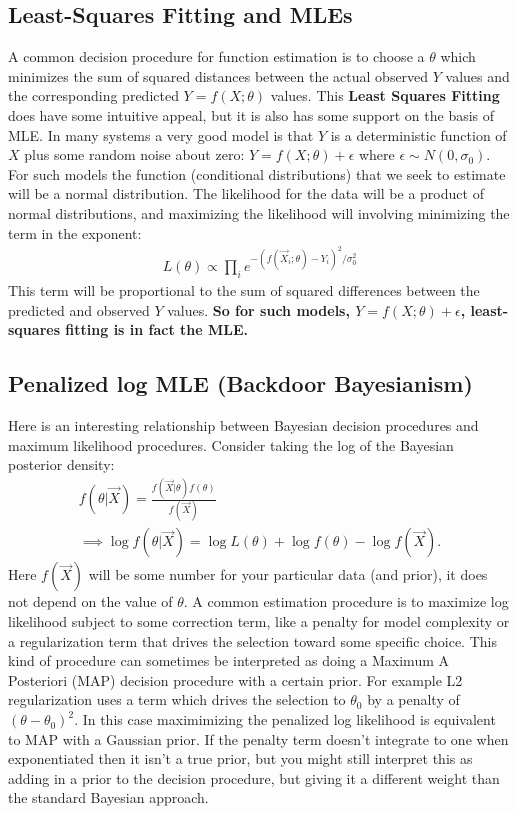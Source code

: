 \subsection{Least-Squares Fitting and MLEs}
A common decision procedure for function estimation is to choose a $\theta$ which minimizes the sum of squared distances between the actual observed $Y$ values and the corresponding predicted $Y = f(X; \theta)$ values. This \textbf{Least Squares Fitting} does have some intuitive appeal, but it is also has some support on the basis of MLE. In many systems a very good model is that $Y$ is a deterministic function of $X$ plus some random noise about zero: $Y = f(X; \theta) + \epsilon$ where $\epsilon \sim N(0, \sigma_0)$. For such models the function (conditional distributions) that we seek to estimate will be a normal distribution. The likelihood for the data will be a product of normal distributions, and maximizing the likelihood will involving minimizing the term in the exponent:
\begin{align*}
L(\theta) \propto \prod_i e^{-(f(\vec{X}_i; \theta)-Y_i)^2/\sigma_0^2}
\end{align*}
This term will be proportional to the sum of squared differences between the predicted and observed $Y$ values. \textbf{So for such models, $Y = f(X; \theta) + \epsilon$, least-squares fitting is in fact the MLE.}

\subsection{Penalized log MLE (Backdoor Bayesianism)}
Here is an interesting relationship between Bayesian decision procedures and maximum likelihood procedures. Consider taking the log of the Bayesian posterior density:
\begin{align*}
f(\theta | \vec{X}) = \frac{f(\vec{X}|\theta)f(\theta)}{f(\vec{X})}\\
\implies \log{f(\theta | \vec{X})} = \log{L(\theta)} + \log{f(\theta)} - \log{f(\vec{X})}.
\end{align*}
Here $f(\vec{X})$ will be some number for your particular data (and prior), it does not depend on the value of $\theta$. A common estimation procedure is to maximize log likelihood subject to some correction term, like a penalty for model complexity or a regularization term that drives the selection toward some specific choice. This kind of procedure can sometimes be interpreted as doing a Maximum A Posteriori (MAP) decision procedure with a certain prior. For example L2 regularization uses a term which drives the selection to $\theta_0$ by a penalty of $(\theta-\theta_0)^2$. In this case maximimizing the penalized log likelihood is equivalent to MAP with a Gaussian prior. If the penalty term doesn't integrate to one when exponentiated then it isn't a true prior, but you might still interpret this as adding in a prior to the decision procedure, but giving it a different weight than the standard Bayesian approach. 


